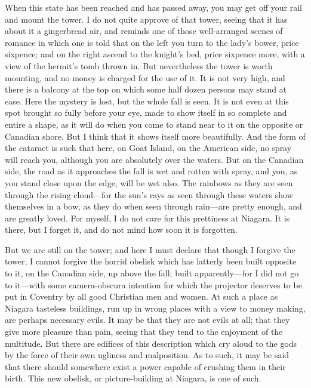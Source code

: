When this state has been reached and has passed away, you may get
off your rail and mount the tower.  I do not quite approve of that
tower, seeing that it has about it a gingerbread air, and reminds
one of those well-arranged scenes of romance in which one is told
that on the left you turn to the lady's bower, price sixpence; and
on the right ascend to the knight's bed, price sixpence more, with
a view of the hermit's tomb thrown in.  But nevertheless the tower
is worth mounting, and no money is charged for the use of it.  It
is not very high, and there is a balcony at the top on which some
half dozen persons may stand at ease.  Here the mystery is lost,
but the whole fall is seen.  It is not even at this spot brought so
fully before your eye, made to show itself in so complete and
entire a shape, as it will do when you come to stand near to it on
the opposite or Canadian shore.  But I think that it shows itself
more beautifully.  And the form of the cataract is such that here,
on Goat Island, on the American side, no spray will reach you,
although you are absolutely over the waters.  But on the Canadian
side, the road as it approaches the fall is wet and rotten with
spray, and you, as you stand close upon the edge, will be wet also.
The rainbows as they are seen through the rising cloud---for the
sun's rays as seen through these waters show themselves in a bow,
as they do when seen through rain---are pretty enough, and are
greatly loved.  For myself, I do not care for this prettiness at
Niagara.  It is there, but I forget it, and do not mind how soon it
is forgotten.

But we are still on the tower; and here I must declare that though
I forgive the tower, I cannot forgive the horrid obelisk which has
latterly been built opposite to it, on the Canadian side, up above
the fall; built apparently---for I did not go to it---with some
camera-obscura intention for which the projector deserves to be put
in Coventry by all good Christian men and women.  At such a place
as Niagara tasteless buildings, run up in wrong places with a view
to money making, are perhaps necessary evils.  It may be that they
are not evils at all; that they give more pleasure than pain,
seeing that they tend to the enjoyment of the multitude.  But there
are edifices of this description which cry aloud to the gods by the
force of their own ugliness and malposition.  As to such, it may be
said that there should somewhere exist a power capable of crushing
them in their birth.  This new obelisk, or picture-building at
Niagara, is one of such.

